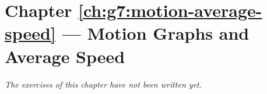 \section*{Chapter \ref{ch:g7:motion-average-speed} --- Motion Graphs and Average Speed}


\emph{The exercises of this chapter have not been written yet.}
